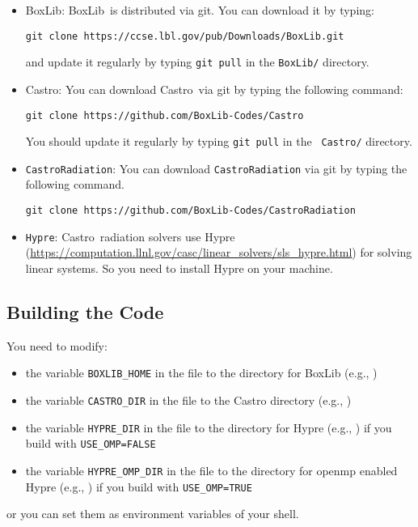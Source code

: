 \documentclass[11pt,letterpaper]{article}
\newcommand{\castro}{{\sf Castro}}
\newcommand{\boxlib}{{\sf BoxLib}}
\begin{document}
\begin{itemize}

\item \boxlib: \boxlib\ is distributed via git.  You can download it
  by typing:
\begin{verbatim}
git clone https://ccse.lbl.gov/pub/Downloads/BoxLib.git
\end{verbatim}
and update it regularly by typing {\tt git pull} in the {\tt BoxLib/}
directory.

\item \castro: You can download \castro\ via git by typing the
  following command:
\begin{verbatim}
git clone https://github.com/BoxLib-Codes/Castro
\end{verbatim}
You should update it regularly by typing {\tt git pull} in the {\tt
  Castro/} directory.

\item {\tt CastroRadiation}: 
You can download {\tt CastroRadiation} via git by typing the following
command.
\begin{verbatim}
git clone https://github.com/BoxLib-Codes/CastroRadiation
\end{verbatim}

\item {\tt Hypre}:
\castro\ radiation solvers use Hypre
(\url{https://computation.llnl.gov/casc/linear_solvers/sls_hypre.html})
for solving linear systems.  So you need to install Hypre on your
machine.
\end{itemize}

\subsection{Building the Code}

You need to modify:
\begin{itemize}
\item the variable {\tt BOXLIB\_HOME} in the file
  {\tt{}} to the
  directory for BoxLib (e.g., {\tt{}})
\item the variable {\tt CASTRO\_DIR} in the file
  {\tt{}} to
  the Castro directory
  (e.g., {\tt{}})
\item the variable {\tt HYPRE\_DIR} in the file
  {\tt{}} to
  the directory for Hypre (e.g., {\tt{}})
  if you build with {\tt USE\_OMP=FALSE}
\item the variable {\tt HYPRE\_OMP\_DIR} in the file
  {\tt{}} to
  the directory for openmp enabled Hypre (e.g., {\tt{}})
  if you build with {\tt USE\_OMP=TRUE}
\end{itemize}
or you can set them as environment variables of your shell.  \\
\end{document}
